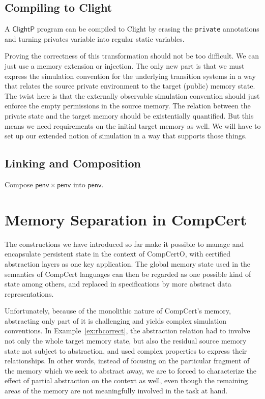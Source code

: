 \documentclass[acmsmall,screen,review,anonymous]{acmart}
\newcommand{\kw}[1]{\ensuremath{ \mathsf{#1} }}
\newcommand{\ClightP}{\ensuremath{\mathsf{ClightP}}}
\begin{document}
\subsection{Compiling to Clight}

A \ClightP{} program can be compiled to Clight
by erasing the \texttt{private} annotations
and turning privates variable into regular
static variables.

Proving the correctness of this transformation
should not be too difficult.
We can just use a memory extension or injection.
The only new part is that we must express
the simulation convention for the underlying transition systems
in a way that relates the source private environment
to the target (public) memory state.
The twist here is that
the externally observable simulation convention
should just enforce the empty permissions in the source memory.
The relation between the private state and the target memory
should be existentially quantified.
But this means we need requirements on the initial target memory as well.
We will have to set up our extended notion of simulation
in a way that supports those things.


\subsection{Linking and Composition} %

Compose $\kw{penv} \times \kw{penv}$ into $\kw{penv}$.


\section{Memory Separation in CompCert} \label{sec:sep} %

The constructions we have introduced so far
make it possible to manage and encapsulate persistent state
in the context of CompCertO,
with certified abstraction layers
as one key application.
The global memory state used in the semantics of CompCert languages
can then be regarded as one possible kind of state among others,
and replaced in specifications by more abstract data representations.

Unfortunately,
because of the monolithic nature of CompCert's memory,
abstracting only part of it is challenging
and yields complex simulation conventions.
In Example~\ref{ex:rbcorrect},
the abstraction relation had to involve
not only the whole target memory state,
but also the residual source memory state
not subject to abstraction,
and used complex properties to express their relationships.
In other words,
instead of focusing on the particular fragment of the memory
which we seek to abstract away,
we are to forced to characterize the effect of partial abstraction
on the context as well,
even though the remaining areas of the memory
are not meaningfully involved in the task at hand.
\end{document}

